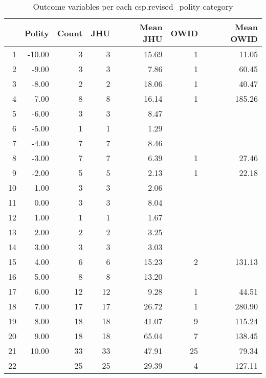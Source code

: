 \begin{table}[ht]
\centering
\caption{Outcome variables per each csp.revised\_polity category} 
\begingroup\footnotesize
\begin{tabular}{rrrrrrr}
  \hline
 & Polity & Count & JHU & Mean JHU & OWID & Mean OWID \\ 
  \hline
1 & -10.00 &   3 &   3 & 15.69 &   1 & 11.05 \\ 
  2 & -9.00 &   3 &   3 & 7.86 &   1 & 60.45 \\ 
  3 & -8.00 &   2 &   2 & 18.06 &   1 & 40.47 \\ 
  4 & -7.00 &   8 &   8 & 16.14 &   1 & 185.26 \\ 
  5 & -6.00 &   3 &   3 & 8.47 &  &  \\ 
  6 & -5.00 &   1 &   1 & 1.29 &  &  \\ 
  7 & -4.00 &   7 &   7 & 8.46 &  &  \\ 
  8 & -3.00 &   7 &   7 & 6.39 &   1 & 27.46 \\ 
  9 & -2.00 &   5 &   5 & 2.13 &   1 & 22.18 \\ 
  10 & -1.00 &   3 &   3 & 2.06 &  &  \\ 
  11 & 0.00 &   3 &   3 & 8.04 &  &  \\ 
  12 & 1.00 &   1 &   1 & 1.67 &  &  \\ 
  13 & 2.00 &   2 &   2 & 3.25 &  &  \\ 
  14 & 3.00 &   3 &   3 & 3.03 &  &  \\ 
  15 & 4.00 &   6 &   6 & 15.23 &   2 & 131.13 \\ 
  16 & 5.00 &   8 &   8 & 13.20 &  &  \\ 
  17 & 6.00 &  12 &  12 & 9.28 &   1 & 44.51 \\ 
  18 & 7.00 &  17 &  17 & 26.72 &   1 & 280.90 \\ 
  19 & 8.00 &  18 &  18 & 41.07 &   9 & 115.24 \\ 
  20 & 9.00 &  18 &  18 & 65.04 &   7 & 138.45 \\ 
  21 & 10.00 &  33 &  33 & 47.91 &  25 & 79.34 \\ 
  22 &  &  25 &  25 & 29.39 &   4 & 127.11 \\ 
   \hline
\end{tabular}
\endgroup
\end{table}
